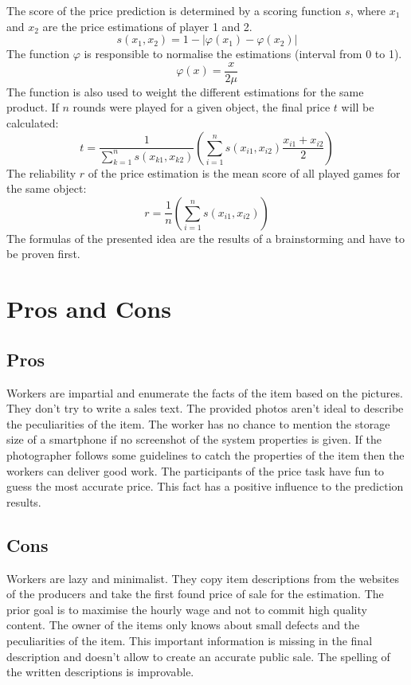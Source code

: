 The score of the price prediction is determined by a scoring function \( s \), where \( x_1 \) and \( x_2 \) are the price estimations of player 1 and 2.
\begin{equation}
s(x_1,x_2) = 1 - |\varphi(x_1) - \varphi(x_2)|
\end{equation}
The function \( \varphi \) is responsible to normalise the estimations (interval from 0 to 1).
\begin{equation}
\varphi(x) = \frac{x}{2\mu}
\end{equation}
The function is also used to weight the different estimations for the same product. If \( n \) rounds were played for a given object, the final price \( t \) will be calculated:
\begin{equation}
t = \frac{1}{\sum_{k=1}^{n} s(x_{k1},x_{k2})}\left(\sum_{i=1}^{n} s(x_{i1},x_{i2})\frac{x_{i1}+x_{i2}}{2}\right)
\end{equation}
The reliability \( r \) of the price estimation is the mean score of all played games for the same object:
\begin{equation}
r = \frac{1}{n}\left(\sum_{i=1}^{n} s(x_{i1},x_{i2})\right)
\end{equation}
The formulas of the presented idea are the results of a brainstorming and have to be proven first.
\section{Pros and Cons}
\subsection{Pros}
Workers are impartial and enumerate the facts of the item based on the pictures. They don't try to write a sales text. The provided photos aren't ideal to describe the peculiarities of the item. The worker has no chance to mention the storage size of a smartphone if no screenshot of the system properties is given. If the photographer follows some guidelines to catch the properties of the item then the workers can deliver good work. The participants of the price task have fun to guess the most accurate price. This fact has a positive influence to the prediction results. 
\subsection{Cons}
Workers are lazy and minimalist. They copy item descriptions from the websites of the producers and take the first found price of sale for the estimation. The prior goal is to maximise the hourly wage and not to commit high quality content. The owner of the items only knows about small defects and the peculiarities of the item. This important information is missing in the final description and doesn't allow to create an accurate public sale. The spelling of the written descriptions is improvable.
